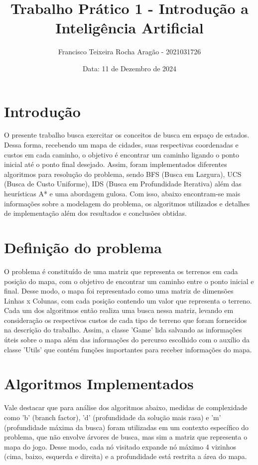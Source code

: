\documentclass[10pt]{extarticle} %
\title{Trabalho Prático 1 - Introdução a Inteligência Artificial}
\author{Francisco Teixeira Rocha Aragão - 2021031726}
\date{Data: 11 de Dezembro de 2024}
\begin{document}
\maketitle

\section{Introdução}

O presente trabalho busca exercitar os conceitos de busca em espaço de estados. Dessa forma, recebendo um mapa de cidades, suas respectivas coordenadas e custos em cada caminho, o objetivo é encontrar um caminho ligando o ponto inicial até o ponto final desejado. Assim, foram implementados diferentes algoritmos para resolução do problema, sendo BFS (Busca em Largura), UCS (Busca de Custo Uniforme), IDS (Busca em Profundidade Iterativa) além das heurísticas A* e uma abordagem gulosa. Com isso, abaixo encontram-se mais informações sobre a modelagem do problema, os algoritmos utilizados e detalhes de implementação além dos resultados e conclusões obtidas.

\section{Definição do problema}

O problema é constituído de uma matriz que representa os terrenos em cada posição do mapa, com o objetivo de encontrar um caminho entre o ponto inicial e final. Desse modo, o mapa foi representado como uma matriz de dimensões Linhas x Colunas, com cada posição contendo um valor que representa o terreno. Cada um dos algoritmos então realiza uma busca nessa matriz, levando em consideração os respectivos custos de cada tipo de terreno que foram fornecidos na descrição do trabalho. Assim, a classe 'Game' lida salvando as informações úteis sobre o mapa além das informações do percurso escolhido com o auxílio da classe 'Utils' que contém funções importantes para receber informações do mapa.

\section{Algoritmos Implementados}

Vale destacar que para análise dos algoritmos abaixo, medidas de complexidade como 'b' (branch factor), 'd' (profundidade da solução mais rasa) e 'm' (profundidade máxima da busca) foram utilizadas em um contexto específico do problema, que não envolve árvores de busca, mas sim a matriz que representa o mapa do jogo. Desse modo, cada nó visitado expande nó máximo 4 vizinhos (cima, baixo, esquerda e direita) e a profundidade está restrita a área do mapa.
\end{document}
